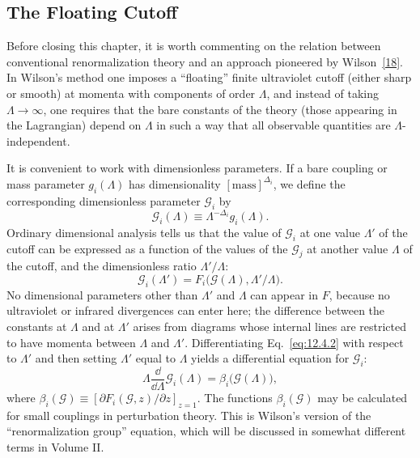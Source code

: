 
\subsection[The Floating Cutoff]{The Floating Cutoff\texorpdfstring{\protect\footnotemark}{}}

Before closing this chapter, it is worth commenting on the relation between
conventional renormalization theory and an approach pioneered by
Wilson~\hyperref[ref:12.18]{[18]}. In Wilson's method one imposes a
``floating'' finite ultraviolet cutoff (either sharp or smooth) at momenta with
components of order $\Lambda$, and instead of taking $\Lambda\to\infty$, one
requires that the bare constants of the theory (those appearing in the
Lagrangian) depend on $\Lambda$ in such a way that all observable quantities
are $\Lambda$-independent.

It is convenient to work with dimensionless parameters. If a bare coupling or
mass parameter $g_i(\Lambda)$ has dimensionality $[\text{mass}]^{\Delta_i}$,
we define the corresponding dimensionless parameter $\mathcal G_i$ by
\begin{equation}
\mathcal G_i(\Lambda)\equiv\Lambda^{-\Delta_i}g_i(\Lambda).
\tag{12.4.1}\label{eq:12.4.1}
\end{equation}
Ordinary dimensional analysis tells us that the value of $\mathcal G_i$ at one
value $\Lambda'$ of the cutoff can be expressed as a function of the values of
the $\mathcal G_j$ at another value $\Lambda$ of the cutoff, and the
dimensionless ratio $\Lambda'/\Lambda$:
\begin{equation}
\mathcal G_i(\Lambda')=F_i\bigl(\mathcal G(\Lambda),\Lambda'/\Lambda\bigr).
\tag{12.4.2}\label{eq:12.4.2}
\end{equation}
No dimensional parameters other than $\Lambda'$ and $\Lambda$ can appear in
$F$, because no ultraviolet or infrared divergences can enter here; the
difference between the constants at $\Lambda$ and at $\Lambda'$ arises from
diagrams whose internal lines are restricted to have momenta between
$\Lambda$ and $\Lambda'$. Differentiating Eq.~\eqref{eq:12.4.2} with respect
to $\Lambda'$ and then setting $\Lambda'$ equal to $\Lambda$ yields a
differential equation for $\mathcal G_i$:
\begin{equation}
\Lambda\frac{\dd}{\dd\Lambda}\mathcal G_i(\Lambda)
=\beta_i\bigl(\mathcal G(\Lambda)\bigr),
\tag{12.4.3}\label{eq:12.4.3}
\end{equation}
where $\beta_i(\mathcal G)\equiv
[\partial F_i(\mathcal G,z)/\partial z]_{z=1}$. The functions
$\beta_i(\mathcal G)$ may be calculated for small couplings in perturbation
theory. This is Wilson's version of the ``renormalization group'' equation,
which will be discussed in somewhat different terms in Volume II.

